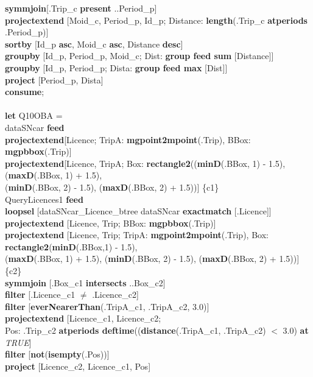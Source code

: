\documentclass[a4paper]{article}
\newcommand{\op}[1]{\textbf{#1}}
\newcommand{\true}{\textsl{TRUE}}
\begin{document}
\begin{scriptsize}
\begin{tabbing}
\>\op{symmjoin}[.Trip\_c \op{present} ..Period\_p]\\
\>\op{projectextend} [Moid\_c, Period\_p, Id\_p; Distance: \op{length}(.Trip\_c \op{atperiods} .Period\_p)]\\
\>\op{sortby} [Id\_p \op{asc}, Moid\_c \op{asc}, Distance \op{desc}]\\
\>\op{groupby} [Id\_p, Period\_p, Moid\_c; Dist: \op{group feed sum} [Distance]]\\
\>\op{groupby} [Id\_p, Period\_p; Dista: \op{group feed max} [Dist]]\\
\>\op{project} [Period\_p, Dista]\\
\op{consume};\\
\\
\op{let} Q10OBA =\\
\>dataSNcar \op{feed}\\
\>\>\op{projectextend}[Licence; TripA: \op{mgpoint2mpoint}(.Trip), BBox: \op{mgpbbox}(.Trip)]\\
\>\>\op{projectextend}[Licence, TripA; Box: \op{rectangle2}((\op{minD}(.BBox, 1) - 1.5), (\op{maxD}(.BBox, 1) + 1.5),\\
\>\>\>\>(\op{minD}(.BBox, 2) - 1.5), (\op{maxD}(.BBox, 2) + 1.5))] \{c1\}\\
\>QueryLicences1 \op{feed}\\
\>\>\op{loopsel} [dataSNcar\_Licence\_btree dataSNcar \op{exactmatch} [.Licence]]\\
\>\>\op{projectextend} [Licence, Trip;  BBox: \op{mgpbbox}(.Trip)]\\
\>\>\op{projectextend} [Licence, Trip; TripA: \op{mgpoint2mpoint}(.Trip), Box: \op{rectangle2}(\op{minD}(.BBox,1) - 1.5),\\
\>\>\>\>(\op{maxD}(.BBox, 1) + 1.5), (\op{minD}(.BBox, 2) - 1.5), (\op{maxD}(.BBox, 2) + 1.5))] \{c2\}\\
\>\op{symmjoin} [.Box\_c1 \op{intersects} ..Box\_c2]\\
\>\op{filter} [.Licence\_c1 $\neq$ .Licence\_c2]\\
\>\op{filter} [\op{everNearerThan}(.TripA\_c1, .TripA\_c2, 3.0)]\\
\>\op{projectextend} [Licence\_c1, Licence\_c2; \\
\>\>\>\>Pos: .Trip\_c2 \op{atperiods deftime}((\op{distance}(.TripA\_c1, .TripA\_c2) $<$ 3.0) \op{at} \true{}]\\
\>\op{filter} [\op{not}(\op{isempty}(.Pos))]\\
\>\op{project} [Licence\_c2, Licence\_c1, Pos]\\

\end{tabbing}
\end{scriptsize}
\end{document}
